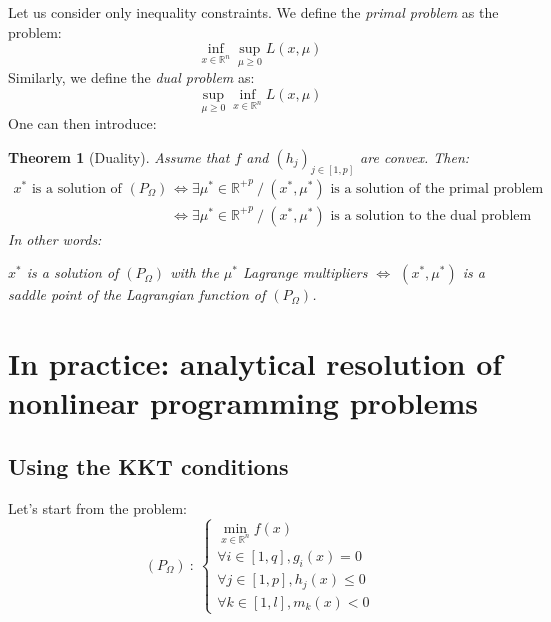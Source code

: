 \documentclass{article}
\newtheorem*{theorem}{Theorem}
\begin{document}
Let us consider only inequality constraints. We define the \emph{primal problem} as the problem:
\begin{equation*}
\inf\limits_{x\in \mathbb{R}^n} \sup\limits_{\mu \geq 0} L(x,\mu)
\end{equation*}
\noindent Similarly, we define the \emph{dual problem} as:
\begin{equation*}
\sup\limits_{\mu \geq 0} \inf\limits_{x\in \mathbb{R}^n} L(x,\mu)
\end{equation*}
One can then introduce:
\begin{theorem}[Duality]Assume that $f$ and $(h_j)_{j\in[1,p]}$ are convex. Then:
\begin{equation*}
\begin{array}{ll}
x^* \textrm{ is a solution of } \left(P_\Omega\right) & \Leftrightarrow
\exists \mu^*\in{\mathbb{R}^+}^p \ / \ (x^*,\mu^*) \textrm{ is a solution of the primal problem}\\
 &\Leftrightarrow \exists \mu^*\in{\mathbb{R}^+}^p \ / \ (x^*,\mu^*)
\textrm{ is a solution to the dual problem}
\end{array}
\end{equation*}
In other words:
\begin{center} $x^*$ is a solution of $\left(P_\Omega\right)$
with the $\mu^*$ Lagrange multipliers $\Leftrightarrow$ $(x^*,\mu^*)$ is a saddle point of the Lagrangian function of $\left(P_\Omega\right)$.
\end{center}
\end{theorem}

\section{In practice: analytical resolution of nonlinear programming problems}

\subsection{Using the KKT conditions}
Let's start from the problem:
\begin{equation*}
\left( P_\Omega \right) \ : \ \left\{ \begin{array}{c}
\min\limits_{x\in\mathbb{R}^n} f(x)\\
\forall i\in [1,q], g_i(x) = 0\\
\forall j\in [1,p], h_j(x) \leq 0\\
\forall k\in [1,l], m_k(x) < 0
\end{array} \right.
\end{equation*}
\end{document}

